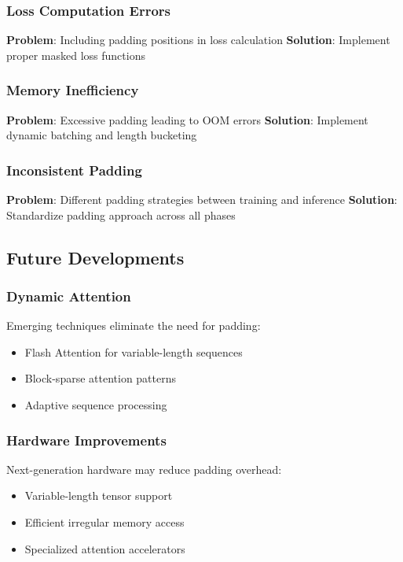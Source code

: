 \subsubsection{Loss Computation Errors}
\textbf{Problem}: Including padding positions in loss calculation
\textbf{Solution}: Implement proper masked loss functions

\subsubsection{Memory Inefficiency}
\textbf{Problem}: Excessive padding leading to OOM errors
\textbf{Solution}: Implement dynamic batching and length bucketing

\subsubsection{Inconsistent Padding}
\textbf{Problem}: Different padding strategies between training and inference
\textbf{Solution}: Standardize padding approach across all phases

\subsection{Future Developments}

\subsubsection{Dynamic Attention}
Emerging techniques eliminate the need for padding:
\begin{itemize}
\item Flash Attention for variable-length sequences
\item Block-sparse attention patterns
\item Adaptive sequence processing
\end{itemize}

\subsubsection{Hardware Improvements}
Next-generation hardware may reduce padding overhead:
\begin{itemize}
\item Variable-length tensor support
\item Efficient irregular memory access
\item Specialized attention accelerators
\end{itemize}

